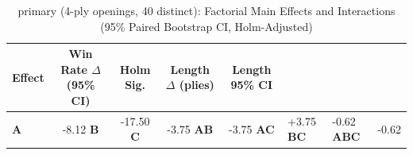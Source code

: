 \begin{table}[htbp]
\centering
\caption{primary (4-ply openings, 40 distinct): Factorial Main Effects and Interactions (95\% Paired Bootstrap CI, Holm-Adjusted)}
\label{tab:factorial_effects}
\begin{tabular}{lcccc}
\toprule
Effect & Win Rate $\Delta$ (95\% CI) & Holm Sig. & Length $\Delta$ (plies) & Length 95\% CI \\
\midrule
\textbf{A} & -8.12%
\textbf{B} & -17.50%
\textbf{C} & -3.75%
\textbf{AB} & -3.75%
\textbf{AC} & +3.75%
\textbf{BC} & -0.62%
\textbf{ABC} & -0.62%
\bottomrule
\end{tabular}
\end{table}
